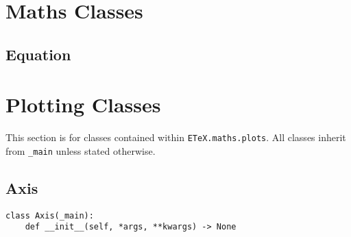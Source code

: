 \documentclass{article}
\begin{document}
\section{Maths Classes}\label{sec:maths_classes}

\subsection{Equation}\label{subsec:equation}

\section{Plotting Classes}\label{sec:plotting_classes}
This section is for classes contained within \verb|ETeX.maths.plots|. All classes inherit from \verb|_main| unless stated otherwise.
\subsection{Axis}\label{subsec:axis}
\begin{verbatim}
class Axis(_main):
	def __init__(self, *args, **kwargs) -> None
\end{verbatim}
\end{document}
